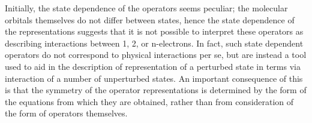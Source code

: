 \documentclass[12pt]{article}
\begin{document}
\noindent Initially, the state dependence of the operators seems peculiar; the
molecular orbitals themselves do not differ between states, hence the state
dependence of the representations suggests that it is not possible to interpret
these operators as describing interactions between 1, 2, or n-electrons.  In
fact, such state dependent operators do not correspond to physical interactions
per se, but are instead a tool used to aid in the description of representation
of a perturbed state in terms via interaction of a number of unperturbed states.
An important consequence of this is that the symmetry of the operator
representations is determined by the form of the equations from which they are
obtained, rather than from consideration of the form of operators themselves.
\end{document}

